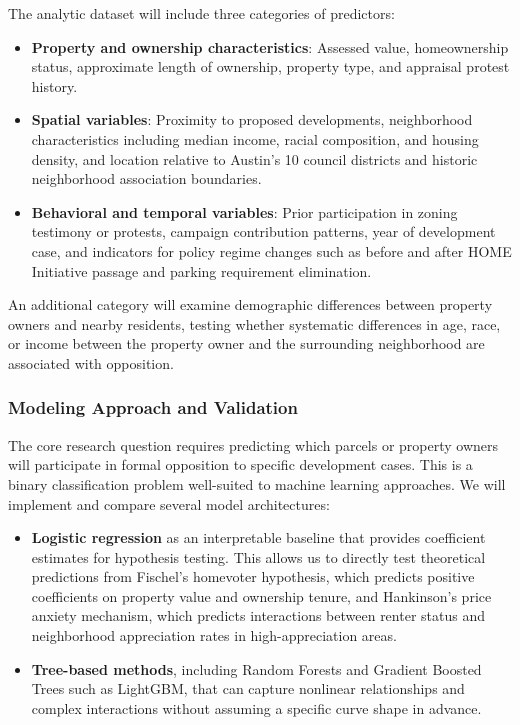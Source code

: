 \documentclass[12pt]{article}
\begin{document}
The analytic dataset will include three categories of predictors:

\begin{itemize}
\item \textbf{Property and ownership characteristics}: Assessed value, homeownership status, approximate length of ownership, property type, and appraisal protest history.
\item \textbf{Spatial variables}: Proximity to proposed developments, neighborhood characteristics including median income, racial composition, and housing density, and location relative to Austin's 10 council districts and historic neighborhood association boundaries.
\item \textbf{Behavioral and temporal variables}: Prior participation in zoning testimony or protests, campaign contribution patterns, year of development case, and indicators for policy regime changes such as before and after HOME Initiative passage and parking requirement elimination.
\end{itemize}

An additional category will examine demographic differences between property owners and nearby residents, testing whether systematic differences in age, race, or income between the property owner and the surrounding neighborhood are associated with opposition.

\subsubsection*{Modeling Approach and Validation}

The core research question requires predicting which parcels or property owners will participate in formal opposition to specific development cases. This is a binary classification problem well-suited to machine learning approaches. We will implement and compare several model architectures:

\begin{itemize}
\item \textbf{Logistic regression} as an interpretable baseline that provides coefficient estimates for hypothesis testing. This allows us to directly test theoretical predictions from Fischel's homevoter hypothesis, which predicts positive coefficients on property value and ownership tenure, and Hankinson's price anxiety mechanism, which predicts interactions between renter status and neighborhood appreciation rates in high-appreciation areas.
\item \textbf{Tree-based methods}, including Random Forests and Gradient Boosted Trees such as LightGBM, that can capture nonlinear relationships and complex interactions without assuming a specific curve shape in advance.
\end{itemize}
\end{document}
